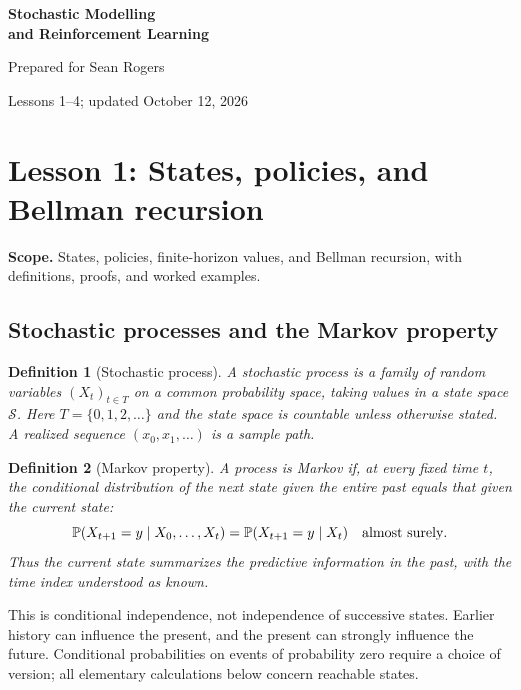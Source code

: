 \documentclass[11pt]{article}
\newtheorem{definition}{Definition}[section]
\theoremstyle{remark}\newtheorem{remark}[definition]{Remark}
\begin{document}
\begin{center}
{\LARGE\bfseries Stochastic Modelling\\[4pt]and Reinforcement Learning}\par
\vspace{8pt}{\large Cumulative lecture notes}\par
\vspace{4pt}Prepared for Sean Rogers\par
{\small Lessons 1--4; updated October 12, 2026}
\end{center}
\vspace{6pt}
{\small\setlength{\parskip}{0pt}\tableofcontents}
\clearpage
\section{Lesson 1: States, policies, and Bellman recursion}
\textbf{Scope.} States, policies, finite-horizon values, and Bellman recursion, with definitions, proofs, and worked examples.

\subsection{Stochastic processes and the Markov property}
\begin{definition}[Stochastic process]
A stochastic process is a family of random variables $(X_t)_{t\in T}$ on a common probability space, taking values in a state space $\mathcal S$. Here $T=\{0,1,2,\ldots\}$ and the state space is countable unless otherwise stated. A realized sequence $(x_0,x_1,\ldots)$ is a sample path.
\end{definition}
\begin{definition}[Markov property]
A process is Markov if, at every fixed time $t$, the conditional distribution of the next state given the entire past equals that given the current state:
\begin{equation}
\mathbb P(X_{t+1}=y\mid X_0,\ldots,X_t)
=\mathbb P(X_{t+1}=y\mid X_t)\quad\text{almost surely}.
\end{equation}
Thus the current state summarizes the predictive information in the past, with the time index understood as known.
\end{definition}
This is conditional independence, not independence of successive states. Earlier history can influence the present, and the present can strongly influence the future. Conditional probabilities on events of probability zero require a choice of version; all elementary calculations below concern reachable states.
\end{document}
